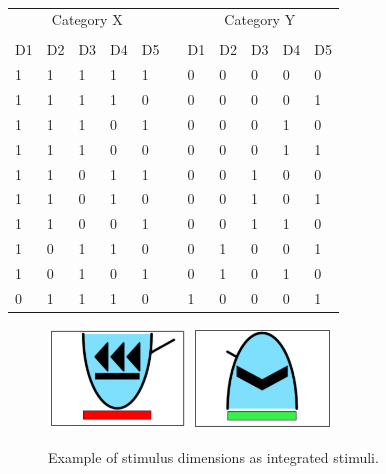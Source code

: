 \documentclass[doc, a4paper, apacite]{apa6}
\begin{document}
\begin{table}
	\centering
	\caption{}
	\label{table:abstractStructure}
	\begin{tabular}{lllllllllll}
		\toprule
		\multicolumn{5}{c}{Category X} &  & \multicolumn{5}{c}{Category Y} \\
		\cline{1-5} \cline{7-11} \\
		D1   & D2   & D3   & D4  & D5  &  & D1   & D2   & D3   & D4  & D5  \\
		\midrule
		1    & 1    & 1    & 1   & 1   &  & 0    & 0    & 0    & 0   & 0   \\
		1    & 1    & 1    & 1   & 0   &  & 0    & 0    & 0    & 0   & 1   \\
		1    & 1    & 1    & 0   & 1   &  & 0    & 0    & 0    & 1   & 0   \\
		1    & 1    & 1    & 0   & 0   &  & 0    & 0    & 0    & 1   & 1   \\
		1    & 1    & 0    & 1   & 1   &  & 0    & 0    & 1    & 0   & 0   \\
		1    & 1    & 0    & 1   & 0   &  & 0    & 0    & 1    & 0   & 1   \\
		1    & 1    & 0    & 0   & 1   &  & 0    & 0    & 1    & 1   & 0   \\
		1    & 0    & 1    & 1   & 0   &  & 0    & 1    & 0    & 0   & 1   \\
		1    & 0    & 1    & 0   & 1   &  & 0    & 1    & 0    & 1   & 0   \\
		0    & 1    & 1    & 1   & 0   &  & 1    & 0    & 0    & 0   & 1   \\
		\bottomrule
	\end{tabular}	
\end{table}

\begin{figure}
	\centering
	\includegraphics[width=0.33\textwidth]{images/integratedStimulusExample}
	\includegraphics[width=0.33\textwidth]{images/integratedStimulusExample2}
	\caption{Example of stimulus dimensions as integrated stimuli.}
	\label{fig:integratedStimuli}
\end{figure}
\end{document}
